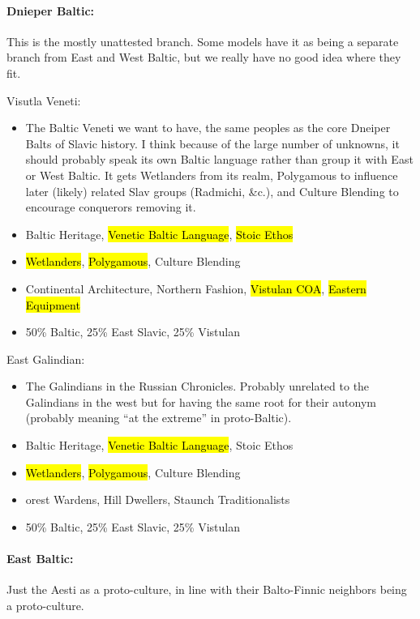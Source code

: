 \documentclass{article}
\begin{document}
	\paragraph{Dnieper Baltic:}
	This is the mostly unattested branch.
	Some models have it as being a separate branch from East and West Baltic, but we really have no good idea where they fit.
	
	Visutla Veneti:
	\begin{itemize}
		\item The Baltic Veneti we want to have, the same peoples as the core Dneiper Balts of Slavic history. I think because of the large number of unknowns, it should probably speak its own Baltic language rather than group it with East or West Baltic. It gets Wetlanders from its realm, Polygamous to influence later (likely) related Slav groups (Radmichi, \&c.), and Culture Blending to encourage conquerors removing it.
		\item Baltic Heritage, \hl{Venetic Baltic Language}, \hl{Stoic Ethos}
		\item \hl{Wetlanders}, \hl{Polygamous}, Culture Blending
		\item Continental Architecture, Northern Fashion, \hl{Vistulan COA}, \hl{Eastern Equipment}
		\item 50\% Baltic, 25\% East Slavic, 25\% Vistulan
	\end{itemize}
	
	East Galindian:
	\begin{itemize}
		\item The Galindians in the Russian Chronicles. Probably unrelated to the Galindians in the west but for having the same root for their autonym (probably meaning “at the extreme” in proto-Baltic).
		\item Baltic Heritage, \hl{Venetic Baltic Language}, Stoic Ethos
		\item \hl{Wetlanders}, \hl{Polygamous}, Culture Blending
		\item orest Wardens, Hill Dwellers, Staunch Traditionalists
		\item 50\% Baltic, 25\% East Slavic, 25\% Vistulan
	\end{itemize}
	
	\paragraph{East Baltic:}
	Just the Aesti as a proto-culture, in line with their Balto-Finnic neighbors being a proto-culture.
	
\end{document}

